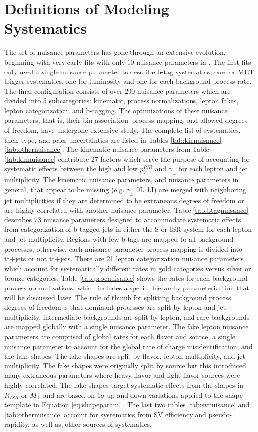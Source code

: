 \section{Definitions of Modeling Systematics}
The set of nuisance parameters has gone through an extensive evolution, beginning with very early fits with only 10 nuisance parameters in \cite{erich}. The first fits only used a single nuisance parameter to describe b-tag systematics, one for MET trigger systematics, one for luminosity and one for each background process rate. The final configuration consists of over 200 nuisance parameters which are divided into 5 subcategories: kinematic, process normalizations, lepton fakes, lepton categorization, and b-tagging. The optimizations of these nuisance parameters, that is, their bin association, process mapping, and  allowed degrees of freedom, have undergone extensive study. The complete list of systematics, their type, and prior uncertainties are listed in Tables \ref{tab:kinnuisance} -- \ref{tab:othernuisance}.  The kinematic nuisance parameters from Table \ref{tab:kinnuisance} contribute 27 factors which serve the purpose of accounting for systematic effects between the high and low $p_T^{ISR}$ and $\gamma_\perp$ for each lepton and jet multiplicity. The kinematic nuisance parameters, and nuisance parameters in general, that appear to be missing (e.g. $\gamma_\perp$ 0L 1J) are merged with neighboring jet multiplicities if they are determined to be extraneous degrees of freedom or are highly correlated with another nuisance parameter. Table \ref{tab:btagnuisance} describes 73 nuisance parameters designed to accommodate systematic effects from categorization of b-tagged jets in either the S or ISR system for each lepton and jet multiplicity. Regions with few b-tags are mapped to all background processes, otherwise, each nuisance parameter process mapping is divided into tt+jets or not tt+jets. There are 21 lepton categorization nuisance parameters which account for systematically different rates in gold categories versus silver or bronze categories. Table \ref{tab:procnuisance} shows the rates for each background process normalizations, which includes a special hierarchy parameterization that will be discussed later. The rule of thumb for splitting background process degrees of freedom is that dominant processes are split by lepton and jet multiplicity, intermediate backgrounds are split by lepton, and rare backgrounds are mapped globally with a single nuisance parameter. The fake lepton nuisance parameters are comprised of global rates for each flavor and source, a single nuisance parameter to account for the global rate of  charge misidentification, and the fake shapes. The fake shapes are split by flavor, lepton multiplicity, and jet multiplicity. The fake shapes were originally split by source but this introduced many extraneous parameters where heavy flavor and light flavor sources were highly correlated. The fake shapes target systematic effects from the shapes in $R_{ISR}$ or $M_\perp$ and are based on $1\sigma$ up and down variations applied to the shape template in Equation \ref{eq:shapeparam} \cite{margaret}. The last two tables \ref{tab:svnuisance} and \ref{tab:othernuisance} account for systematics from SV efficiency and pseudo-rapidity, as well as, other sources of systematics.

